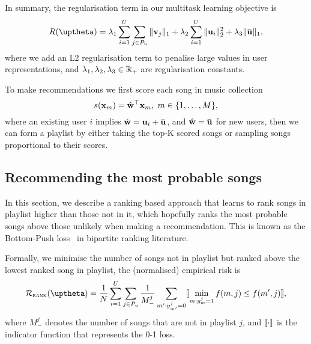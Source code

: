 In summary, the regularisation term in our multitask learning objective is
\begin{equation}
\label{eq:reg}
R(\uptheta) = \lambda_1 \sum_{i=1}^U \sum_{j \in P_u} \|\bv_j\|_1 + \lambda_2 \sum_{i=1}^U \|\bu_i\|_2^2 + \lambda_3 \|\widebar\bu\|_1,
\end{equation}
where we add an L2 regularisation term to penalise large values in user representations,
and $\lambda_1, \lambda_2, \lambda_3 \in \mathbb{R}_+$ are regularisation constants.

To make recommendations we first score each song in music collection
$$
s(\mathbf{x}_m) = \hat {\mathbf{w}}^\top \mathbf{x}_m, \ m \in \{1,\dots,M\},
$$
where an existing user $i$ implies $\hat\w = \bu_i + \widebar\bu$, and $\hat\w = \widebar\bu$ for new users,
then we can form a playlist by either taking the top-K scored songs or sampling songs proportional to their scores.

\subsection{Recommending the most probable songs}
\label{ssec:bploss}

In this section, we describe a ranking based approach that learns to rank songs in playlist higher
than those not in it, which hopefully ranks the most probable songs above those unlikely when making a recommendation.
This is known as the Bottom-Push loss~\cite{rudin2009p} in bipartite ranking literature.


Formally, we minimise the number of songs not in playlist but ranked above the lowest ranked song in playlist,
\ie the (normalised) empirical risk is
\begin{equation}
\label{eq:bprisk}
\resizebox{.9\linewidth}{!}{$\displaystyle
\RCal_\textsc{rank}(\uptheta) = \frac{1}{N} \sum_{i=1}^U \sum_{j \in P_u} \frac{1}{M_-^j} \sum_{m': y_{m'}^j = 0} 
\llb \min_{m: y_m^j = 1} f(m, j) \le f(m', j) \rrb,
$}
\end{equation}
where $M_-^j$ denotes the number of songs that are not in playlist $j$,
and $\llbracket \cdot \rrbracket$ is the indicator function that represents the 0-1 loss.

